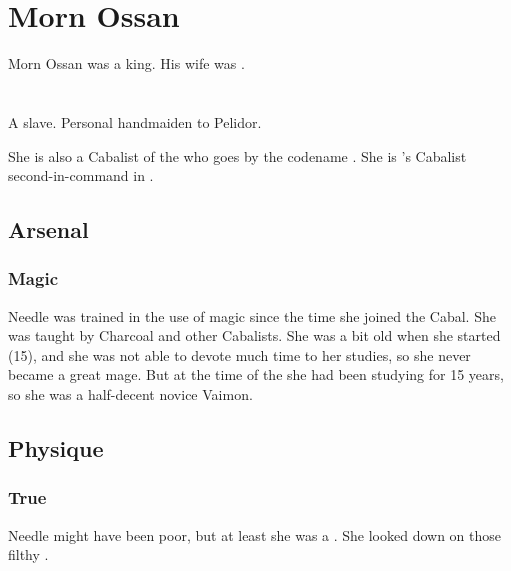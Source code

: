 \section{Morn Ossan}
Morn Ossan was a \human king. 
His wife was . 















\section{\Piacet}
A slave. 
Personal handmaiden to  Pelidor. 

She is also a Cabalist of the  who goes by the codename . 
She is 's Cabalist second-in-command in \Malcur. 










\subsection{Arsenal}
\subsubsection{Magic}
Needle was trained in the use of magic since the time she joined the Cabal. 
She was taught by Charcoal and other Cabalists. 
She was a bit old when she started (15), and she was not able to devote much time to her studies, so she never became a great mage. 
But at the time of the  she had been studying for 15 years, so she was a half-decent novice Vaimon. 









\subsection{Physique}





\subsubsection{True \human}
Needle might have been poor, but at least she was a \truehuman. 
She looked down on those filthy .








